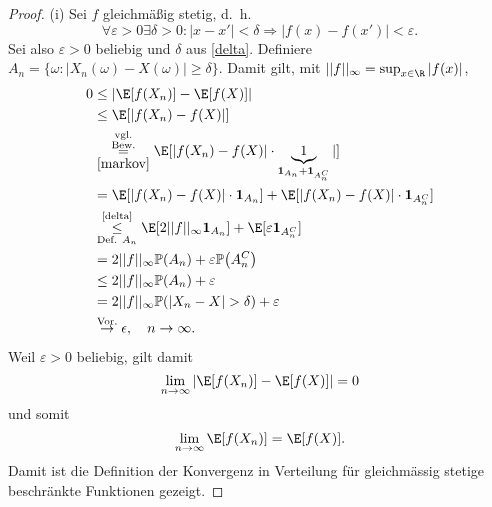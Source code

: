 \begin{proof}
(i) Sei $f$ gleichm\"a\ss ig stetig, \mbox{d. h.} 
			\begin{equation}\label{delta}
				\forall \varepsilon>0 \exists \delta > 0\colon |x-x'| < \delta \Rightarrow |f(x)-f(x')| < \varepsilon.
			\end{equation}
			Sei also $\varepsilon > 0$ beliebig und $\delta$ aus \eqref{delta}. Definiere $A_n = \{ \omega\colon |X_n(\omega) - X(\omega)| \geq \delta \}$. Damit gilt, mit $||f||_\infty=\sup_{x\in\R} |f(x)|$,
			\begin{align*}
				0 &\leq | \E[f(X_n)] - \E[f(X)] |\\
				& \leq \E[|f(X_n) - f(X)|]\\
				& \overset{\substack{\text{vgl.}\\\text{Bew.}}}{\underset{\ref{markov}}{=}} \E[|f(X_n) - f(X)|\cdot \underbrace{1}_{\mathbf 1_{A_n}+\mathbf 1_{A_n^C}}|]\\ 
				&= \E[|f(X_n) - f(X)|\cdot \mathbf{1}_{A_n}] + \E[|f(X_n) - f(X)|\cdot \mathbf{1}_{A_n^C}]\\
				&\overset{\text{\eqref{delta}}}{\underset{\text{Def. } A_n}{\leq}} \E[2 ||f||_{\infty} \mathbf{1}_{A_n}] + \E[\varepsilon \mathbf{1}_{A_n^C}]\\
				& = 2 ||f||_{\infty} \mathbb{P}(A_n) + \varepsilon \mathbb{P}\big(A_n^C\big)\\
				&\leq 2 ||f||_{\infty}\mathbb{P}(A_n) + \varepsilon\\
				& = 2 ||f||_{\infty}\mathbb{P}(|X_n-X| > \delta) + \varepsilon\\
				&\overset{\text{Vor.}}{\rightarrow} \epsilon, \quad n\to\infty.
			\end{align*}
			Weil $\varepsilon > 0$ beliebig, gilt damit \[ \lim\limits_{n \to \infty} |\E[f(X_n)] - \E[f(X)]| = 0 \]
			und somit
			\[ \lim\limits_{n \to \infty} \E[f(X_n)] = \E[f(X)]. \]
		Damit ist die Definition der Konvergenz in Verteilung f\"ur gleichm\"assig stetige beschr\"ankte Funktionen gezeigt.\smallskip
		

\end{proof}
